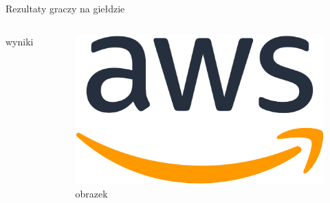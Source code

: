 \begin{frame}{Rezultaty graczy na giełdzie}
    \begin{columns}[t]
            wyniki
        \centering
        \begin{figure}
            \centering
            \includegraphics[width=1\textwidth]{images/aws_logo.png}
            \caption{obrazek}
            \label{fig:pic}
        \end{figure}    
    \end{columns}
\end{frame}
